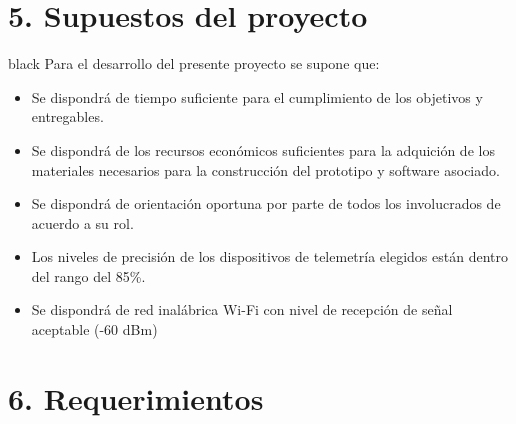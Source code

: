 \documentclass[
11pt, %
codirector, %
]{charter}
\begin{document}
\section{5. Supuestos del proyecto}
\label{sec:supuestos}

\begin{consigna}{black}
Para el desarrollo del presente proyecto se supone que: 

\begin{itemize}
	\item Se dispondrá de tiempo suficiente para el cumplimiento de los objetivos y entregables.
	\item Se dispondrá de los recursos económicos suficientes para la adquición de los materiales necesarios para la construcción del prototipo y software asociado.
	\item Se dispondrá de orientación oportuna por parte de todos los involucrados de acuerdo a su rol.
	\item Los niveles de precisión de los dispositivos de telemetría elegidos están dentro del rango del 85\%.
	\item Se dispondrá de red inalábrica Wi-Fi con nivel de recepción de señal aceptable (-60 dBm)
\end{itemize}

\end{consigna}

\section{6. Requerimientos}
\label{sec:requerimientos}
\end{document}
